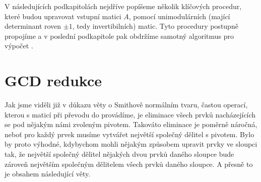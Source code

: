 V následujících podkapitolách nejdříve popíšeme několik klíčových procedur, které
budou upravovat vstupní matici $ A $, pomocí unimodulárních (mající determinant
roven $\pm 1$, tedy invertibilních) matic.
Tyto procedury postupně propojíme a v poslední podkapitole pak obdržíme samotný
algoritmus pro výpočet \rst.

\section{GCD redukce}
Jak jsme viděli již v důkazu věty o Smithově normálním tvaru, častou operací,
kterou s maticí při převodu do \snf provádíme, je eliminace všech prvků
nacházejících se pod nějakým námi zvoleným pivotem. Takováto eliminace je poměrně
náročná, neboť pro každý prvek musíme vytvářet největší společný dělitel s pivotem.
Bylo by proto výhodné, kdybychom mohli nějakým způsobem upravit prvky ve sloupci tak,
že největší společný dělitel nějakých dvou prvků daného sloupce bude zároveň největším
společným dělitelem všech prvků daného sloupce. A přesně to je obsahem následující věty.


